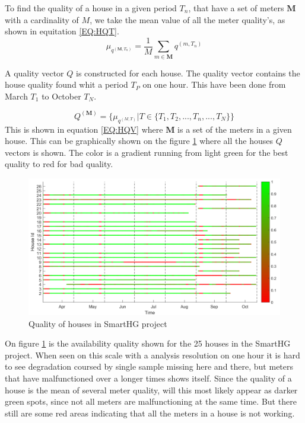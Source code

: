 To find the quality of a house in a given period $T_n$, that have a set of meters $\mathbf{M}$ with a cardinality of $M$, we take the mean value of all the meter quality's, as shown in equitation \ref{EQ:HQT}.  
\begin{equation}
	\mu_{q^{(\mathbf{M},T_n)}} = \frac{1}{M} \sum_{m \in \mathbf{M}} q^{(m,T_n)}
	\label{EQ:HQT}
\end{equation}



A quality vector $Q$ is constructed for each house. The quality vector contains the house quality found whit a period $T_P$ on one hour. This have been done from March $T_1$ to October $T_N$. 

\begin{equation}
	Q^{(\mathbf{M})} = \{ \mu_{q^{(M,T)}} | T \in \{T_1, T_2, ... ,T_n,..., T_N  \} \}
	\label{EQ:HQV}
\end{equation}
This is shown in equation \ref{EQ:HQV} where $\mathbf{M}$ is a set of the meters in a given house. This can be graphically shown on the figure \ref{fig:SmartHGQuality} where all the houses $Q$ vectors is shown. The color is a gradient running from light green for the best quality to red for bad quality.
\begin{figure}[H]
\centering
\includegraphics[width=1\textwidth]{billeder/QualityBig.png}
\caption{Quality of houses in SmartHG project}
\label{fig:SmartHGQuality}
\end{figure} 

On figure \ref{fig:SmartHGQuality} is the availability quality shown for the 25 houses in the SmartHG project. When seen on this scale with a analysis resolution on one hour it is hard to see degradation coursed by single sample missing here and there, but meters that have malfunctioned over a longer times shows itself. Since the quality of a house is the mean of several meter quality, will this most likely appear as darker green spots, since not all meters are malfunctioning at the same time. But there still are some red areas indicating that all the meters in a house is not working. 

